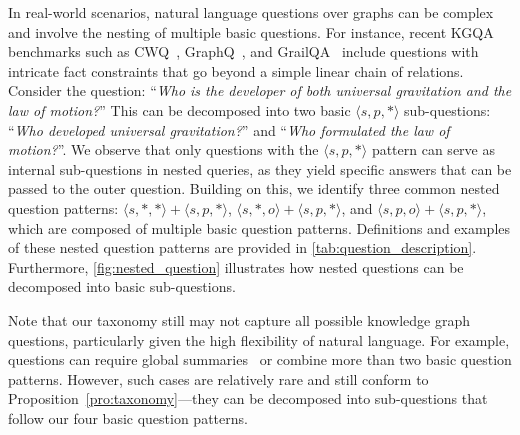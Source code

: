  In real-world scenarios, natural language questions over graphs can be complex and involve the nesting of multiple basic questions. For instance, recent KGQA benchmarks such as CWQ~\cite{cwq}, GraphQ~\cite{cwq}, and GrailQA~\cite{grailqa} include questions with intricate fact constraints that go beyond a simple linear chain of relations. Consider the question: ``\textit{Who is the developer of both universal gravitation and the law of motion?}'' This can be decomposed into two basic $\langle s, p, * \rangle$ sub-questions: ``\textit{Who developed universal gravitation?}'' and ``\textit{Who formulated the law of motion?}''. We observe that only questions with the $\langle s, p, * \rangle$ pattern can serve as internal sub-questions in nested queries, as they yield specific answers that can be passed to the outer question. Building on this, we identify three common nested question patterns: $\langle s, *, * \rangle + \langle s, p, * \rangle$, $\langle s, *, o \rangle + \langle s, p, * \rangle$, and $\langle s, p, o \rangle + \langle s, p, * \rangle$, which are composed of multiple basic question patterns. Definitions and examples of these nested question patterns are provided in \autoref{tab:question_description}. Furthermore, \autoref{fig:nested_question} illustrates how nested questions can be decomposed into basic sub-questions.


Note that our taxonomy still may not capture all possible knowledge graph questions, particularly given the high flexibility of natural language. For example, questions can require global summaries~\cite{ms_graphrag} or combine more than two basic question patterns. However, such cases are relatively rare and still conform to Proposition~\ref{pro:taxonomy}—they can be decomposed into sub-questions that follow our four basic question patterns.

